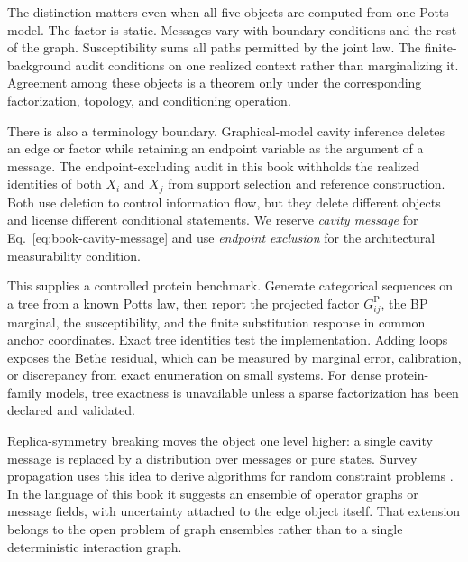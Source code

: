 The distinction matters even when all five objects are computed from one Potts model.  The factor
is static.  Messages vary with boundary conditions and the rest of the graph.  Susceptibility sums
all paths permitted by the joint law.  The finite-background audit conditions on one realized
context rather than marginalizing it.  Agreement among these objects is a theorem only under the
corresponding factorization, topology, and conditioning operation.

There is also a terminology boundary.  Graphical-model cavity inference deletes an edge or factor
while retaining an endpoint variable as the argument of a message.  The endpoint-excluding audit
in this book withholds the realized identities of both $X_i$ and $X_j$ from support selection and
reference construction.  Both use deletion to control information flow, but they delete different
objects and license different conditional statements.  We reserve \emph{cavity message} for
Eq.~\ref{eq:book-cavity-message} and use \emph{endpoint exclusion} for the architectural
measurability condition.

This supplies a controlled protein benchmark.  Generate categorical sequences on a tree from a
known Potts law, then report the projected factor $G_{ij}^{\mathrm P}$, the BP marginal, the
susceptibility, and the finite substitution response in common anchor coordinates.  Exact
tree identities test the implementation.  Adding loops exposes the Bethe residual, which can be
measured by marginal error, calibration, or discrepancy from exact enumeration on small systems.
For dense protein-family models, tree exactness is unavailable unless a sparse factorization has
been declared and validated.

Replica-symmetry breaking moves the object one level higher: a single cavity message is replaced
by a distribution over messages or pure states.  Survey propagation uses this idea to derive
algorithms for random constraint problems \cite{mezard2002sat}.  In the language of this book it
suggests an ensemble of operator graphs or message fields, with uncertainty attached to the edge
object itself.  That extension belongs to the open problem of graph ensembles rather than to a
single deterministic interaction graph.
